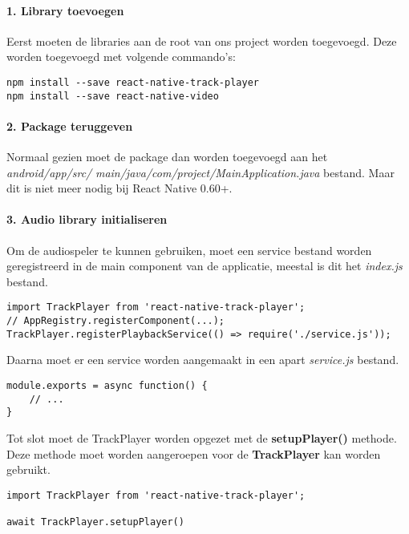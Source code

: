 \paragraph{1. Library toevoegen}
Eerst moeten de libraries aan de root van ons project worden toegevoegd. 
Deze worden toegevoegd met volgende commando's:
\begin{verbatim}
npm install --save react-native-track-player
npm install --save react-native-video
\end{verbatim}

\paragraph{2. Package teruggeven}
Normaal gezien moet de package dan worden toegevoegd aan het 
\textit{android/app/src/} \textit{main/java/com/project/MainApplication.java} bestand.
Maar dit is niet meer nodig bij React Native 0.60+.

\paragraph{3. Audio library initialiseren}
Om de audiospeler te kunnen gebruiken, moet een service bestand worden geregistreerd in de main 
component van de applicatie, meestal is dit het \textit{index.js} bestand.
\begin{verbatim}
import TrackPlayer from 'react-native-track-player';
// AppRegistry.registerComponent(...);
TrackPlayer.registerPlaybackService(() => require('./service.js'));
\end{verbatim}
Daarna moet er een service worden aangemaakt in een apart \textit{service.js} bestand.
\begin{verbatim}
module.exports = async function() {
    // ...
}
\end{verbatim}
Tot slot moet de TrackPlayer worden opgezet met de \textbf{setupPlayer()} methode. Deze methode
moet worden aangeroepen voor de \textbf{TrackPlayer} kan worden gebruikt.
\begin{verbatim}
import TrackPlayer from 'react-native-track-player';

await TrackPlayer.setupPlayer()
\end{verbatim}

